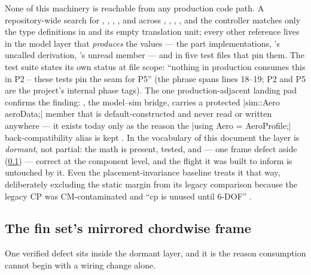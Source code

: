 None of this machinery is reachable from any production code path. A repository-wide search
for , , , , and
 across , , ,
, and the controller matches only the type definitions in
 and its empty translation unit; every other reference lives in the model
layer that \emph{produces} the values --- the part implementations, 's
uncalled derivation, 's unread member --- and in five test files that pin
them. The
test suite states its own status at file scope: ``nothing in production consumes this in P2
-- these tests pin the seam for P5''  (the phrase spans
lines 18--19; P2 and P5 are the project's internal phase tags). The one production-adjacent
landing pad confirms the finding: , the model--sim bridge, carries a
protected \cppinline|sim::Aero aeroData;| member  that is
default-constructed and never read or written anywhere --- it exists today only as the
reason the \cppinline|using Aero = AeroProfile;| back-compatibility alias is kept
. In the vocabulary of this document the layer is \emph{dormant}, not
partial: the math is present, tested, and --- one frame defect aside
(\cref{sec:aero-finmirror}) --- correct at the component level, and the flight it
was built to inform is untouched by it. Even the placement-invariance baseline treats it
that way, deliberately excluding the static margin from its legacy comparison because the
legacy CP was CM-contaminated and ``cp is unused until 6-DOF''
.

\subsection{The fin set's mirrored chordwise frame}\label{sec:aero-finmirror}

One verified defect sits inside the dormant layer, and it is the reason consumption cannot
begin with a wiring change alone.

